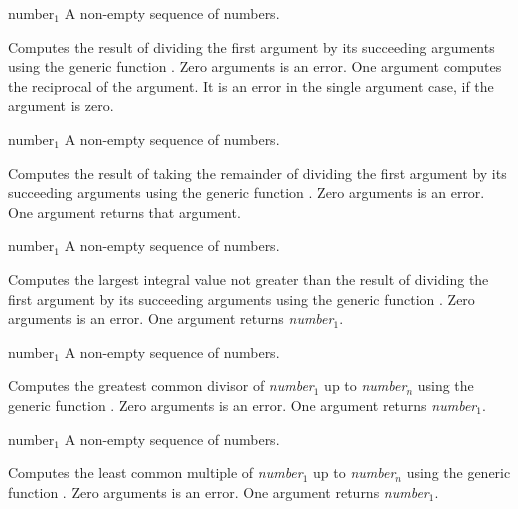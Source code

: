 \begin{optDefinition}
\function{/}
%
\begin{arguments}
    \item[{number$_1$ \optional{number$_2$ ...}}] A non-empty sequence of
    numbers.
\end{arguments}
%
\result%
Computes the result of dividing the first argument by its succeeding arguments
using the generic function .  Zero arguments is an
error.  One argument computes the reciprocal of the argument.  It is an error in
the single argument case, if the argument is zero.

%
\begin{arguments}
    \item[{number$_1$ \optional{number$_2$ ...}}] A non-empty sequence of
    numbers.
\end{arguments}
%
\result%
Computes the result of taking the remainder of dividing the first argument by
its succeeding arguments using the generic function
.  Zero arguments is an error.
One argument returns that argument.

%
\begin{arguments}
    \item[{number$_1$ \optional{number$_2$ ...}}] A non-empty sequence of
    numbers.
\end{arguments}
%
\result%
Computes the largest integral value not greater than the result of dividing the
first argument by its succeeding arguments using the generic function
.  Zero arguments is an error.  One argument returns {\em
    number$_1$}.

%
\begin{arguments}
    \item[{number$_1$ \optional{number$_2$ ...}}] A non-empty sequence of
    numbers.
\end{arguments}
%
\result%
Computes the greatest common divisor of {\em number$_1$} up to {\em number$_n$}
using the generic function .  Zero arguments is an error.  One
argument returns {\em number$_1$}.

%
\begin{arguments}
    \item[{number$_1$ \optional{number$_2$ ...}}] A non-empty sequence of
    numbers.
\end{arguments}
%
\result%
Computes the least common multiple of {\em number$_1$} up to {\em number$_n$}
using the generic function .  Zero arguments is an error.  One
argument returns {\em number$_1$}.


\end{optDefinition}
